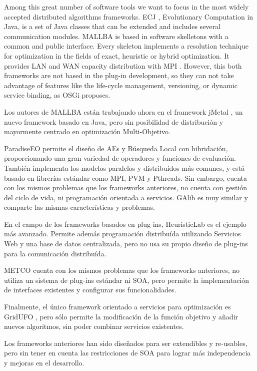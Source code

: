 \documentclass[runningheads]{llncs}
\begin{document}
Among this great number of software tools we want to focus in the most widely accepted distributed algorithms frameworks. ECJ \cite{ECJ}, Evolutionary Computation in Java, is a set of Java classes that can be extended and includes several communication modules. MALLBA \cite{MALLBA} is based in software skelletons with a common and public interface. Every skeleton implements a resolution technique for optimization in the fields of exact, heuristic or hybrid optimization. It provides LAN and WAN capacity distribution with MPI . However, this both frameworks are not based in the plug-in development, so they can not take advantage of features like the life-cycle management, versioning, or dynamic service binding, as OSGi proposes.

Los autores de MALLBA están trabajando ahora en el framework jMetal \cite{JMETAL}, un nuevo framework basado en Java, pero sin posibilidad de distribución y mayormente centrado en optimización Multi-Objetivo.

ParadiseEO \cite{PARADISEO} permite el diseño de AEs y Búsqueda Local con hibridación, proporcionando una gran variedad de operadores y funciones de evaluación. También implementa los modelos paralelos y distribuídos más comunes, y está basado en librerías estándar como MPI, PVM y Pthreads. Sin embargo, cuenta con los mismos problemas que los frameworks anteriores, no cuenta con gestión del ciclo de vida, ni programación orientada a servicios. GAlib \cite{GALIB} es muy similar y comparte las mismas características y problemas. 

En el campo de los frameworks basados en plug-ins, HeuristicLab \cite{HEURISTICLAB} es el ejemplo más avanzado. Permite además programación distribuída utilizando Servicios Web y una base de datos centralizada, pero no usa su propio diseño de plug-ins para la comunicación distribuída.


METCO  \cite{METCO} cuenta con los mismos problemas que los frameworks anteriores, no utiliza un sistema de plug-ins estándar ni SOA, pero permite la implementación de interfaces existentes y configurar sus funcionalidades. 

Finalmente, el único framework orientado a servicios para optimización es GridUFO \cite{GRIDUFO}, pero sólo permite la modificación de la función objetivo y añadir nuevos algoritmos, sin poder combinar servicios existentes.

Los frameworks anteriores han sido diseñados para ser extendibles y re-usables, pero sin tener en cuenta las restricciones de SOA para lograr más independencia y mejoras en el desarrollo.
\end{document}
